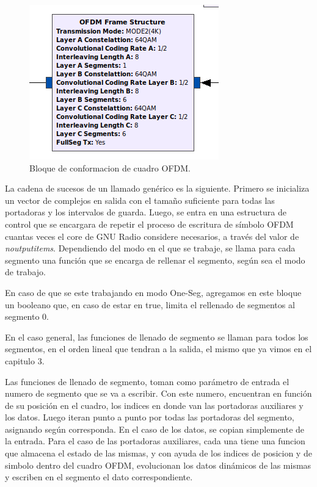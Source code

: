 \begin{figure}[!h]
	\centering
	\includegraphics[scale=0.5]{figuras/cap05/bloque_ofdm}
	\caption{\label{f:bloque_ofdm} Bloque de conformacion de cuadro OFDM.}
\end{figure}

La cadena de sucesos de un llamado genérico es la siguiente. Primero se inicializa un vector de complejos en salida con el tamaño suficiente para todas las portadoras y los intervalos de guarda. Luego, se entra en una estructura de control que se encargara de  repetir el proceso de escritura de símbolo OFDM cuantas veces el core de GNU Radio considere necesarios, a través del valor de \textit{noutputitems}. Dependiendo del modo en el que se trabaje, se llama para cada segmento una función que se encarga de rellenar el segmento, según sea el modo de trabajo.

En caso de que se este trabajando en modo One-Seg, agregamos en este bloque un booleano que, en caso de estar en true, limita el rellenado de segmentos al segmento 0. 

En el caso general, las funciones de llenado de segmento se llaman para todos los segmentos, en el orden lineal que tendran a la salida, el mismo que ya vimos en el capitulo 3.

Las funciones de llenado de segmento, toman como parámetro de entrada el numero de segmento que se va a escribir. Con este numero, encuentran en función de su posición en el cuadro, los indices en donde van las portadoras auxiliares y los datos. Luego iteran punto a punto por todas las portadoras del segmento, asignando según corresponda. En el caso de los datos, se copian simplemente de la entrada. Para el caso de las portadoras auxiliares, cada una tiene una funcion que almacena el estado de las mismas, y con ayuda de los indices de posicion y de simbolo dentro del cuadro OFDM, evolucionan los datos dinámicos de las mismas y escriben en el segmento el dato correspondiente. 
	
